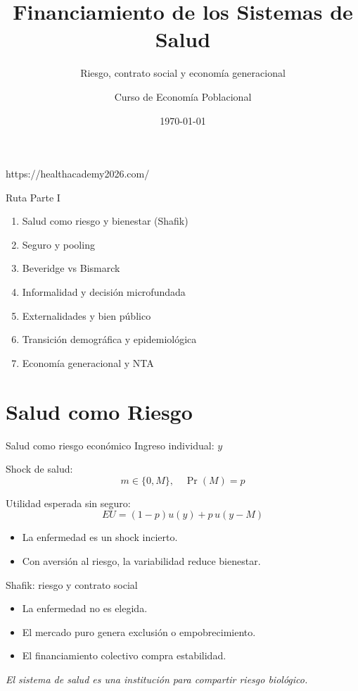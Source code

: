 https://healthacademy2026.com/\documentclass[10pt]{beamer}
\title[Financiamiento en Salud]{Financiamiento de los Sistemas de Salud}
\subtitle{Riesgo, contrato social y economía generacional}
\author{Curso de Economía Poblacional}
\institute{Tecnológico de Monterrey}
\date{\today}
\begin{document}
\begin{frame}
\titlepage
\end{frame}

\begin{frame}{Ruta Parte I}
\begin{enumerate}
\item Salud como riesgo y bienestar (Shafik)
\item Seguro y pooling
\item Beveridge vs Bismarck
\item Informalidad y decisión microfundada
\item Externalidades y bien público
\item Transición demográfica y epidemiológica
\item Economía generacional y NTA
\end{enumerate}
\end{frame}

\section{Salud como Riesgo}

\begin{frame}{Salud como riesgo económico}
Ingreso individual: $y$

Shock de salud:
\[
m \in \{0, M\}, \quad \Pr(M)=p
\]

Utilidad esperada sin seguro:
\[
EU = (1-p)u(y) + p\,u(y-M)
\]

\begin{itemize}
\item La enfermedad es un shock incierto.
\item Con aversión al riesgo, la variabilidad reduce bienestar.
\end{itemize}
\end{frame}

\begin{frame}{Shafik: riesgo y contrato social}
\begin{itemize}
\item La enfermedad no es elegida.
\item El mercado puro genera exclusión o empobrecimiento.
\item El financiamiento colectivo compra estabilidad.
\end{itemize}

\bigskip
\centering
\emph{El sistema de salud es una institución para compartir riesgo biológico.}
\end{frame}
\end{document}
